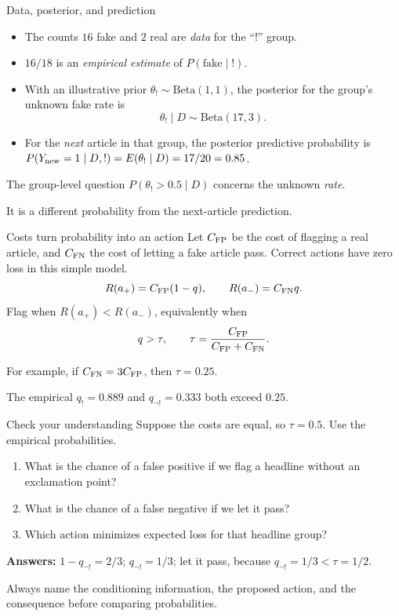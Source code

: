 \documentclass[aspectratio=43,10pt]{beamer}
\begin{document}
\begin{frame}{Data, posterior, and prediction}
\begin{itemize}
\item The counts $16$ fake and $2$ real are \emph{data} for the ``!'' group.
\item $16/18$ is an \emph{empirical estimate} of $P(\text{fake}\mid !)$.
\item With an illustrative prior $\theta_!\sim\mathrm{Beta}(1,1)$,
the posterior for the group's unknown fake rate is
\[
\theta_!\mid D\sim\mathrm{Beta}(17,3).
\]
\item For the \emph{next} article in that group, the posterior predictive
probability is $P(Y_{\rm new}=1\mid D,!)=E(\theta_!\mid D)=17/20=0.85$.
\end{itemize}

\vspace{0.2em}
The group-level question $P(\theta_!>0.5\mid D)$ concerns the unknown
\emph{rate}.

\medskip
It is a different probability from the next-article prediction.
\end{frame}

\begin{frame}{Costs turn probability into an action}
Let $C_{\rm FP}$ be the cost of flagging a real article, and
$C_{\rm FN}$ the cost of letting a fake article pass. Correct actions
have zero loss in this simple model.
\[
R(a_+)=C_{\rm FP}(1-q),\qquad R(a_-)=C_{\rm FN}q.
\]
Flag when $R(a_+)<R(a_-)$, equivalently when
\[
q>\tau,\qquad \tau=\frac{C_{\rm FP}}{C_{\rm FP}+C_{\rm FN}}.
\]

\medskip
For example, if $C_{\rm FN}=3C_{\rm FP}$, then $\tau=0.25$.

\medskip
The empirical $q_!=0.889$ and $q_{\neg !}=0.333$ both exceed $0.25$.
\end{frame}

\begin{frame}{Check your understanding}
Suppose the costs are equal, so $\tau=0.5$. Use the empirical probabilities.
\begin{enumerate}
\item What is the chance of a false positive if we flag a headline
without an exclamation point?
\item What is the chance of a false negative if we let it pass?
\item Which action minimizes expected loss for that headline group?
\end{enumerate}
\pause
\medskip
\textbf{Answers:} $1-q_{\neg !}=2/3$;
$q_{\neg !}=1/3$;
let it pass, because $q_{\neg !}=1/3<\tau=1/2$.

\medskip
Always name the conditioning information, the proposed action, and the
consequence before comparing probabilities.
\end{frame}
\end{document}
